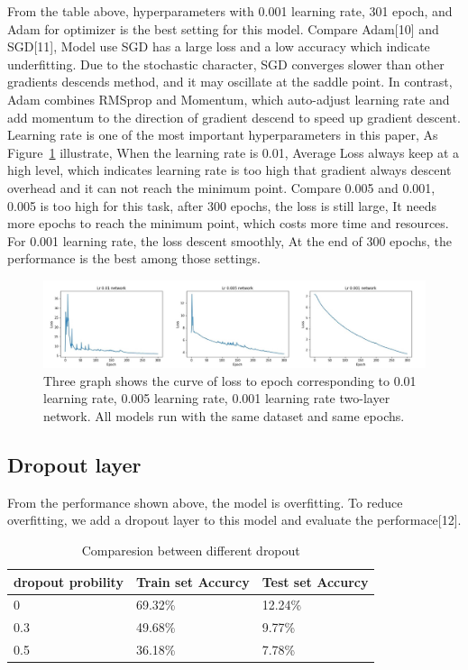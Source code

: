 \documentclass[runningheads]{llncs}
\begin{document}
From the table above, hyperparameters with 0.001 learning rate, 301 epoch, and Adam for optimizer is the best setting for this model. Compare Adam[10] and SGD[11], Model use SGD has a large loss and a low accuracy which indicate underfitting. Due to the stochastic character, SGD converges slower than other gradients descends method, and it may oscillate at the saddle point. In contrast, Adam combines RMSprop and Momentum, which auto-adjust learning rate and add momentum to the direction of gradient descend to speed up gradient descent. Learning rate is one of the most important hyperparameters in this paper, As Figure~\ref{fig6} illustrate, When the learning rate is 0.01, Average Loss always keep at a high level, which indicates learning rate is too high that gradient always descent overhead and it can not reach the minimum point. Compare 0.005 and 0.001, 0.005 is too high for this task, after 300 epochs, the loss is still large, It needs more epochs to reach the minimum point, which costs more time and resources. For 0.001 learning rate, the loss descent smoothly, At the end of 300 epochs, the performance is the best among those settings.
\begin{figure}
	\includegraphics[width=18cm]{fig6.jpg}
	\caption{Three graph shows the curve of loss to epoch corresponding to 0.01 learning rate, 0.005 learning rate, 0.001 learning rate two-layer network. All models run with the same dataset and same epochs.} \label{fig6}
\end{figure}

\subsection{Dropout layer}
From the performance shown above, the model is overfitting. To reduce overfitting, we add a dropout layer to this model and evaluate the performace[12].

\begin{table}
	\caption{Comparesion between different dropout}\label{tab3}
	\begin{center}
		\begin{tabular}{|l|l|l|}
			\hline
			dropout probility & Train set Accurcy & Test set Accurcy\\
			\hline
			0    & 69.32\%  & 12.24\%\\
			0.3  & 49.68\%  & 9.77\%\\
			0.5  & 36.18\%  & 7.78\%\\
			\hline
		\end{tabular}
	\end{center}
\end{table}
\end{document}
